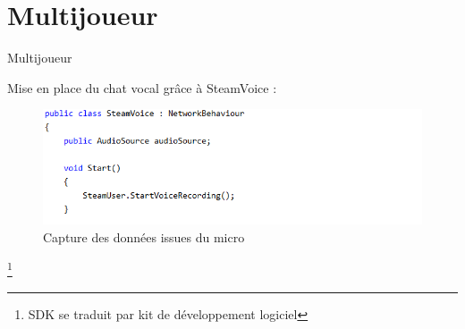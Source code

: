 \section{Multijoueur}

\begin{frame}{Multijoueur}
\setlength{\parindent}{5ex}

Mise en place du chat vocal grâce à SteamVoice :
\setlength{\parindent}{0ex}

\begin{figure}[H]
\centering
  \centering
  \includegraphics[width=.6\linewidth]{img/voicestart.png}
  \caption{Capture des données issues du micro}
  \label{fig:houses}
\end{figure}

\footnote{SDK se traduit par kit de développement logiciel}

\end{frame}